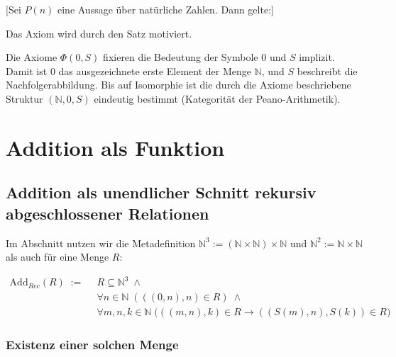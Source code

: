 \documentclass[main.tex]{subfiles}
\begin{document}
[Sei \(P(n)\) eine Aussage über natürliche Zahlen. Dann gelte:]
\begin{remark}
Das Axiom wird durch den Satz 
motiviert.
\end{remark}

\begin{remark}
Die Axiome \(\Phi(0,S)\) fixieren die Bedeutung der Symbole \(0\) und \(S\) 
implizit. 
Damit ist \(0\) das ausgezeichnete erste Element der Menge \(\mathbb{N}\), 
und \(S\) beschreibt die Nachfolgerabbildung. 
Bis auf Isomorphie ist die durch die Axiome beschriebene Struktur 
\((\mathbb{N},0,S)\) eindeutig bestimmt (Kategorität der Peano-Arithmetik).
\end{remark}

\section{Addition als Funktion}
\subsection{Addition als unendlicher Schnitt rekursiv abgeschlossener Relationen}

Im Abschnitt nutzen wir die Metadefinition \(\mathbb{N}^3:=(\mathbb{N}\times\mathbb{N})\times\mathbb{N}\) und \(\mathbb{N}^2:=\mathbb{N}\times\mathbb{N}\) als auch für eine Menge \(R\):


\(\begin{aligned}
\mathrm{Add}_{Rec}(R)\;:=\;&\ R \subseteq \mathbb{N}^3 \;\land\\
&\ \forall n\in\mathbb{N}\;(((0,n),n)\in R) \;\land\\
&\ \forall m,n,k\in\mathbb{N}\;\bigl(((m,n),k)\in R \rightarrow ((S(m),n),S(k))\in R\bigr)
\end{aligned}
\)

\subsubsection{Existenz einer solchen Menge}

\begin{tabproof}
\end{tabproof}
\end{document}
